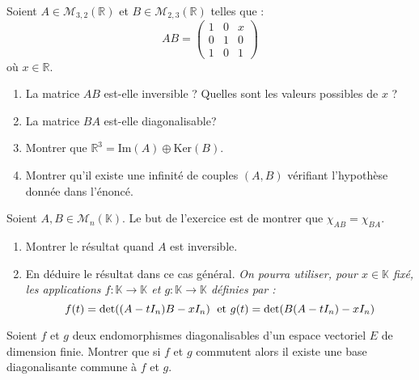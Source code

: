 \documentclass[a4paper,10pt]{report}
\begin{document}
\begin{Exercice}{} Soient $A \in \mathcal{M}_{3,2}(\mathbb{R})$ et $B \in \mathcal{M}_{2,3}(\mathbb{R})$ telles que :
$$ AB = \begin{pmatrix}
1 & 0 & x \\
0 & 1 & 0 \\
1 & 0 & 1 
\end{pmatrix}$$
où $x \in \mathbb{R}$.
\begin{enumerate}
\item La matrice $AB$ est-elle inversible ? Quelles sont les valeurs possibles de $x$ ?
\item La matrice $BA$ est-elle diagonalisable?
\item Montrer que $\mathbb{R}^3 = \textrm{Im}(A) \oplus \textrm{Ker}(B)$.
\item Montrer qu'il existe une infinité de couples $(A,B)$ vérifiant l'hypothèse donnée dans l'énoncé.
\end{enumerate}
\end{Exercice}



\begin{Exercice}{} Soient $A,B \in \mathcal{M}_{n}(\mathbb{K})$. Le but de l'exercice est de montrer que $\chi_{AB} = \chi_{BA}$.
\begin{enumerate}
\item Montrer le résultat quand $A$ est inversible.
\item En déduire le résultat dans ce cas général. \textit{On pourra utiliser, pour $x \in \mathbb{K}$ fixé, les applications $f : \mathbb{K} \rightarrow \mathbb{K}$ et $g : \mathbb{K} \rightarrow \mathbb{K}$ définies par :}
$$ f(t) = \textrm{det}((A-t I_n)B -x I_n) \; \hbox{ et } g(t) = \textrm{det}(B(A-tI_n)-xI_n)$$
\end{enumerate}
\end{Exercice}


\begin{Exercice}{}  Soient $f$ et $g$ deux endomorphismes diagonalisables d'un espace vectoriel $E$ de dimension finie. Montrer que si $f$ et $g$ commutent alors il existe une base diagonalisante commune à $f$ et $g$.
\end{Exercice}
\end{document}
